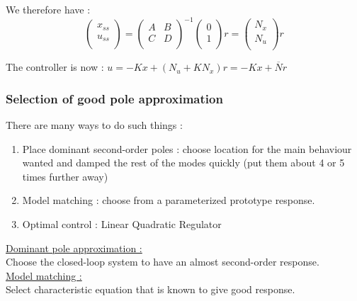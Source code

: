 \documentclass[../main.tex]{subfiles}
\begin{document}
We therefore have : \begin{equation}
    \begin{pmatrix}
        x_{ss}\\ u_{ss}\\
    \end{pmatrix} = \begin{pmatrix}
        A & B\\ C & D\\
    \end{pmatrix}^{-1} \begin{pmatrix}
        0 \\1\\
    \end{pmatrix}r = \begin{pmatrix}
        N_x\\N_u\\
    \end{pmatrix}r
\end{equation}

The controller is now : $u = -Kx + (N_u + KN_x)r = -Kx + \overline{N}r$\\

\subsubsection{Selection of good pole approximation}

There are many ways to do such things : \begin{enumerate}
    \item Place dominant second-order poles : choose location for the main behaviour wanted and damped the rest of the modes quickly (put them about 4 or 5 times further away)\\
    \item Model matching : choose from a parameterized prototype response.\\
    \item Optimal control : Linear Quadratic Regulator\\
\end{enumerate}

\quad \underline{Dominant pole approximation :}\\
Choose the closed-loop system to have an almost second-order response.\\

\quad \underline{Model matching :}\\
Select characteristic equation that is known to give good response.\\
\end{document}
